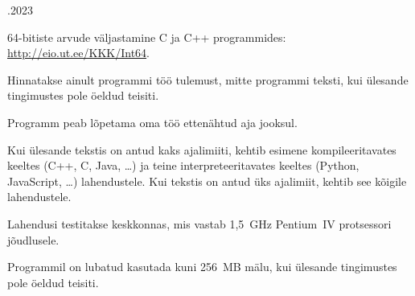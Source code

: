 \documentclass[a4paper,10pt]{article}
\begin{document}
\begin{ol}{\eio}{.2023}{\juh}{}
\begin{xitem}
\begin{xitem}
  \item 64-bitiste arvude väljastamine C ja C++ programmides: \url{http://eio.ut.ee/KKK/Int64}.

  \end{xitem}

\item Hinnatakse ainult programmi töö tulemust, mitte programmi teksti, kui ülesande tingimustes pole öeldud teisiti.

\item Programm peab lõpetama oma töö ettenähtud aja jooksul.

  \begin{xitem}

  \item  Kui ülesande tekstis on antud kaks ajalimiiti, kehtib esimene kompileeritavates keeltes (C++, C, Java, \ldots) ja teine interpreteeritavates keeltes (Python, JavaScript, \ldots) lahendustele. Kui tekstis on antud üks ajalimiit, kehtib see kõigile lahendustele.

  \item Lahendusi testitakse keskkonnas, mis vastab 1{,}5~GHz Pentium~IV protsessori jõudlusele.

  \end{xitem}

\item Programmil on lubatud kasutada kuni 256~MB mälu, kui ülesande tingimustes pole öeldud teisiti.

\end{xitem}

\end{ol}
\end{document}
